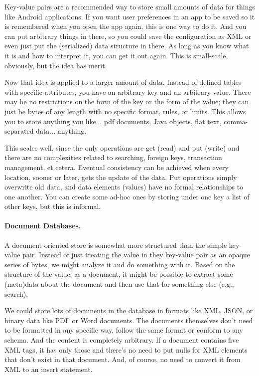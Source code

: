Key-value pairs are a recommended way to store small amounts of data for things like Android applications. If you want user preferences in an app to be saved so it is remembered when you open the app again, this is one way to do it. And you can put arbitrary things in there, so you could save the configuration as XML or even just put the (serialized) data structure in there. As long as you know what it is and how to interpret it, you can get it out again. This is small-scale, obviously, but the idea has merit.

Now that idea is applied to a larger amount of data. Instead of defined tables with specific attributes, you have an arbitrary key and an arbitrary value. There may be no restrictions on the form of the key or the form of the value; they can just be  bytes of any length with no specific format, rules, or limits. This allows you to store anything you like... pdf documents, Java objects, flat text, comma-separated data... anything.

This scales well, since the only operations are get (read) and put (write) and there are no complexities related to searching, foreign keys, transaction management, et cetera. Eventual consistency can be achieved when every location, sooner or later, gets the update of the data. Put operations simply overwrite old data, and data elements (values) have no formal relationships to one another. You can create some ad-hoc ones by storing under one key a list of other keys, but this is informal.

\paragraph{Document Databases.} 

A document oriented store is somewhat more structured than the simple key-value pair. Instead of just treating the value in they key-value pair as an opaque series of bytes, we might analyze it and do something with it. Based on the structure of the value, as a document, it might be possible to extract some (meta)data about the document and then use that for something else (e.g., search). 

We could store lots of documents in the database in formats like XML, JSON, or binary data like PDF or Word documents. The documents themselves don't need to be formatted in any specific way, follow the same format or conform to any schema. And the content is completely arbitrary. If a document contains five XML tags, it has only those and there's no need to put nulls for XML elements that don't exist in that document. And, of course, no need to convert it from XML to an insert statement.

